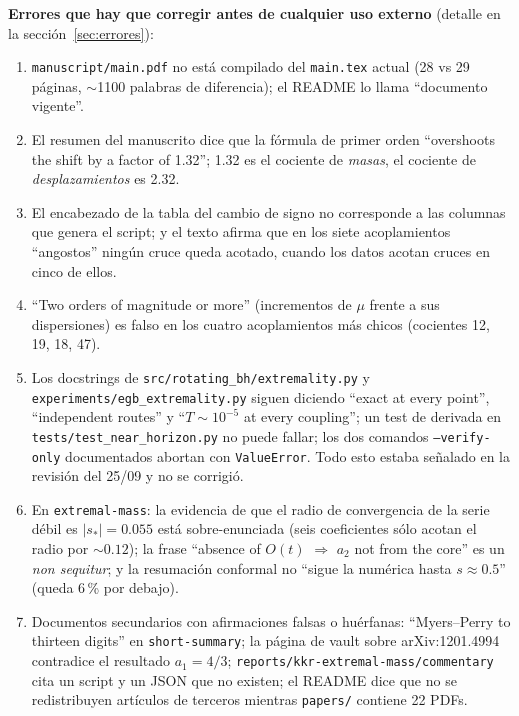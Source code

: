 \documentclass[10pt,a4paper]{article}
\newcommand{\code}[1]{\texttt{#1}}
\begin{document}
\textbf{Errores que hay que corregir antes de cualquier uso externo} (detalle en la
sección~\ref{sec:errores}):
\begin{enumerate}[nosep]
\item \code{manuscript/main.pdf} no está compilado del \code{main.tex} actual (28 vs 29 páginas,
 $\sim$1100 palabras de diferencia); el README lo llama ``documento vigente''.
\item El resumen del manuscrito dice que la fórmula de primer orden ``overshoots the shift by a
 factor of 1.32''; 1.32 es el cociente de \emph{masas}, el cociente de \emph{desplazamientos} es 2.32.
\item El encabezado de la tabla del cambio de signo no corresponde a las columnas que genera el
 script; y el texto afirma que en los siete acoplamientos ``angostos'' ningún cruce queda acotado,
 cuando los datos acotan cruces en cinco de ellos.
\item ``Two orders of magnitude or more'' (incrementos de $\mu$ frente a sus dispersiones) es falso en
 los cuatro acoplamientos más chicos (cocientes 12, 19, 18, 47).
\item Los docstrings de \code{src/rotating\_bh/extremality.py} y
 \code{experiments/egb\_extremality.py} siguen diciendo ``exact at every point'', ``independent
 routes'' y ``$T\sim10^{-5}$ at every coupling''; un test de derivada en
 \code{tests/test\_near\_horizon.py} no puede fallar; los dos comandos \code{--verify-only}
 documentados abortan con \code{ValueError}. Todo esto estaba señalado en la revisión del 25/09 y
 no se corrigió.
\item En \code{extremal-mass}: la evidencia de que el radio de convergencia de la serie débil es
 $|s_*|=0.055$ está sobre-enunciada (seis coeficientes sólo acotan el radio por $\sim0.12$); la
 frase ``absence of $O(t)$ $\Rightarrow$ $a_2$ not from the core'' es un \emph{non sequitur}; y la
 resumación conformal no ``sigue la numérica hasta $s\approx0.5$'' (queda 6\,\% por debajo).
\item Documentos secundarios con afirmaciones falsas o huérfanas: ``Myers--Perry to thirteen digits''
 en \code{short-summary}; la página de vault sobre arXiv:1201.4994 contradice el resultado $a_1=4/3$;
 \code{reports/kkr-extremal-mass/commentary} cita un script y un JSON que no existen; el README
 dice que no se redistribuyen artículos de terceros mientras \code{papers/} contiene 22 PDFs.
\end{enumerate}
\end{document}
